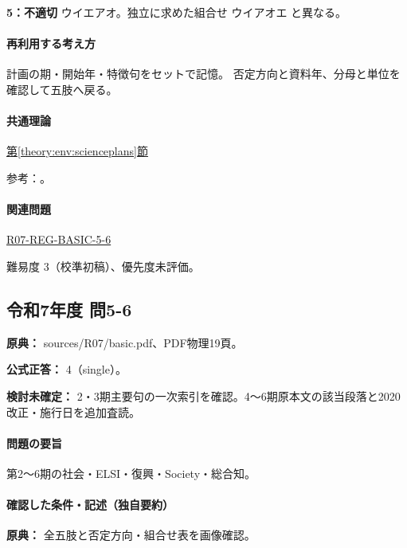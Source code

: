 \noindent\textbf{5：不適切} ウイエアオ。独立に求めた組合せ ウイアオエ と異なる。\par

\paragraph{再利用する考え方} 計画の期・開始年・特徴句をセットで記憶。 否定方向と資料年、分母と単位を確認して五肢へ戻る。

\paragraph{共通理論} \hyperref[theory:env:scienceplans]{第\ref*{theory:env:scienceplans}節}

\par 参考：\cite{env60_plan2,env60_plan3}。

\paragraph{関連問題} \hyperref[q:r07-reg-basic-5-6]{R07-REG-BASIC-5-6}

\par 難易度 3（校準初稿）、優先度未評価。

\subsection{令和7年度 問5-6}
\label{q:r07-reg-basic-5-6}

\noindent\textbf{原典：} sources/R07/basic.pdf、PDF物理19頁。

\textbf{公式正答：} 4（single）。

\par\textbf{検討未確定：} 2・3期主要句の一次索引を確認。4〜6期原本文の該当段落と2020改正・施行日を追加査読。

\paragraph{問題の要旨} 第2〜6期の社会・ELSI・復興・Society・総合知。

\paragraph{確認した条件・記述（独自要約）}\mbox{}\par

\noindent\textbf{原典：} 全五肢と否定方向・組合せ表を画像確認。\par

